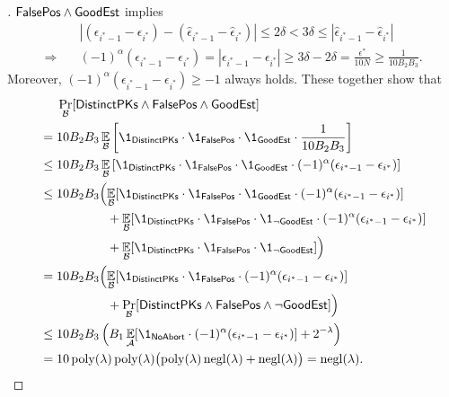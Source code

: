 \begin{proof}[]
${{\smash{\mathsf{FalsePos}}}\wedge{\smash{\mathsf{GoodEst}}}}$ implies
\begin{align*}
&
|
(\epsilon_{i^\ast-1}-\epsilon_{i^\ast})
-
(\widehat{\epsilon}_{i^\ast-1}-\widehat{\epsilon}_{i^\ast})
|
\leq
2\delta
<
3\delta
\leq
|\widehat{\epsilon}_{i^\ast-1}-\widehat{\epsilon}_{i^\ast}|
\\{}\Longrightarrow{}\quad&
(-1)^\alpha(\epsilon_{i^\ast-1}-\epsilon_{i^\ast})
=|\epsilon_{i^\ast-1}-\epsilon_{i^\ast}|
\geq 3\delta-2\delta
=\frac{\epsilon^\ast}{10N}
\geq\frac{1}{10B_2B_3}.
\end{align*}
Moreover, ${(-1)^\alpha(\epsilon_{i^\ast-1}-\epsilon_{i^\ast})\geq -1}$ always holds.
These together show that
\begin{align*}
&
\Pr_\scriptB[\DistinctPKs\wedge\FalsePos\wedge\GoodEst]
\\{}={}&
10B_2B_3\E_\scriptB\left[
\1_\DistinctPKs\cdot\1_\FalsePos\cdot\1_\GoodEst\cdot\frac{1}{10B_2B_3}
\right]
\\{}\leq{}&
10B_2B_3\E_\scriptB\left[
\1_\DistinctPKs\cdot\1_\FalsePos\cdot\1_\GoodEst
\cdot(-1)^\alpha(\epsilon_{i^\ast-1}-\epsilon_{i^\ast})
\right]
\\{}\leq{}&
10B_2B_3\Bigl(
\E_\scriptB[
\1_\DistinctPKs\cdot\1_\FalsePos\cdot\1_\GoodEst
\cdot(-1)^\alpha(\epsilon_{i^\ast-1}-\epsilon_{i^\ast})
]
\\&
\hphantom{10B_2B_3\Bigl({}}{}
+
\E_\scriptB[
\1_\DistinctPKs\cdot\1_\FalsePos\cdot\1_{\neg\GoodEst}
\cdot(-1)^\alpha(\epsilon_{i^\ast-1}-\epsilon_{i^\ast})
]
\\&
\hphantom{10B_2B_3\Bigl({}}{}
+
\E_\scriptB[\1_\DistinctPKs\cdot\1_\FalsePos\cdot\1_{\neg\GoodEst}]
\Bigr)
\\{}={}&
10B_2B_3\Bigl(
\E_\scriptB[
\1_\DistinctPKs\cdot\1_\FalsePos
\cdot(-1)^\alpha(\epsilon_{i^\ast-1}-\epsilon_{i^\ast})
]
\\&\hphantom{10B_2B_3\Bigl({}}{}
+\Pr_\scriptB[\DistinctPKs\wedge\FalsePos\wedge\neg\GoodEst]
\Bigr)
\\{}\leq{}&
10B_2B_3\left(
B_1\E_\scriptA[
\1_\NoAbort\cdot(-1)^\alpha(\epsilon_{i^\ast-1}-\epsilon_{i^\ast})
]
+2^{-\lambda}
\right)
\\{}={}&
10\poly(\lambda)\poly(\lambda)
\bigl(\poly(\lambda)\negl(\lambda)+\negl(\lambda)\bigr)
=\negl(\lambda).
\qedhere
\end{align*}
\end{proof}
